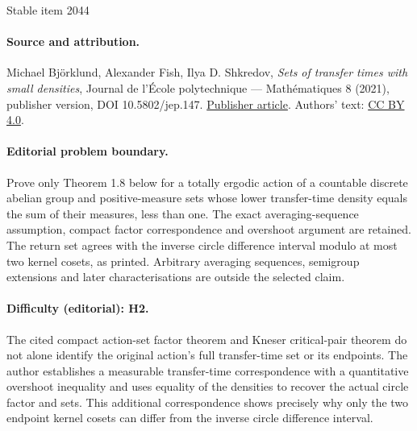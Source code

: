 \documentclass[11pt]{article}
\numberwithin{equation}{section}
\begin{document}
\begin{center}{\Large Stable item 2044}\end{center}
\paragraph{Source and attribution.}
Michael Björklund, Alexander Fish, Ilya D. Shkredov, \emph{Sets of transfer times with small densities}, Journal de l’École polytechnique — Mathématiques 8 (2021), publisher version, DOI 10.5802/jep.147. \href{https://jep.centre-mersenne.org/articles/10.5802/jep.147/}{Publisher article}. Authors' text: \href{https://creativecommons.org/licenses/by/4.0/}{CC BY 4.0}.
\paragraph{Editorial problem boundary.}
Prove only Theorem 1.8 below for a totally ergodic action of a countable discrete abelian group and positive-measure sets whose lower transfer-time density equals the sum of their measures, less than one. The exact averaging-sequence assumption, compact factor correspondence and overshoot argument are retained. The return set agrees with the inverse circle difference interval modulo at most two kernel cosets, as printed. Arbitrary averaging sequences, semigroup extensions and later characterisations are outside the selected claim.
\paragraph{Difficulty (editorial): H2.}
The cited compact action-set factor theorem and Kneser critical-pair theorem do not alone identify the original action's full transfer-time set or its endpoints. The author establishes a measurable transfer-time correspondence with a quantitative overshoot inequality and uses equality of the densities to recover the actual circle factor and sets. This additional correspondence shows precisely why only the two endpoint kernel cosets can differ from the inverse circle difference interval.
\end{document}
